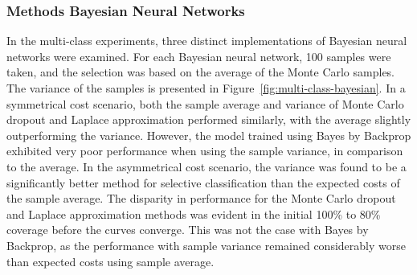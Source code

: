 \subsubsection{Methods Bayesian Neural Networks}
In the multi-class experiments, three distinct implementations of Bayesian neural networks were examined. For each Bayesian neural network, 100 samples were taken, and the selection was based on the average of the Monte Carlo samples. The variance of the samples is presented in Figure~\ref{fig:multi-class-bayesian}. In a symmetrical cost scenario, both the sample average and variance of Monte Carlo dropout and Laplace approximation performed similarly, with the average slightly outperforming the variance. However, the model trained using Bayes by Backprop exhibited very poor performance when using the sample variance, in comparison to the average. In the asymmetrical cost scenario, the variance was found to be a significantly better method for selective classification than the expected costs of the sample average. The disparity in performance for the Monte Carlo dropout and Laplace approximation methods was evident in the initial 100\% to 80\% coverage before the curves converge. This was not the case with Bayes by Backprop, as the performance with sample variance remained considerably worse than expected costs using sample average.

